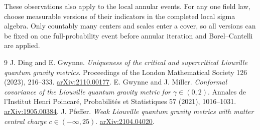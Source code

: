 \documentclass[11pt]{article}
\theoremstyle{definition}
\theoremstyle{remark}
\begin{document}
These observations also apply to the local annular events.
For any one field law, choose measurable versions of their
indicators in the completed local sigma algebra. Only
countably many centers and scales enter a cover, so all
versions can be fixed on one full-probability event before
annular iteration and Borel--Cantelli are applied.

\begin{thebibliography}{9}
J. Ding and E. Gwynne.
\emph{Uniqueness of the critical and supercritical Liouville quantum
gravity metrics}. Proceedings of the London Mathematical Society
126 (2023), 216--333. \href{https://arxiv.org/abs/2110.00177}{arXiv:2110.00177}.
E. Gwynne and J. Miller.
\emph{Conformal covariance of the Liouville quantum gravity metric
for $\gamma\in(0,2)$}. Annales de l'Institut Henri Poincar\'e,
Probabilit\'es et Statistiques 57 (2021), 1016--1031.
\href{https://arxiv.org/abs/1905.00384}{arXiv:1905.00384}.
J. Pfeffer.
\emph{Weak Liouville quantum gravity metrics with matter central
charge $c\in(-\infty,25)$}.
\href{https://arxiv.org/abs/2104.04020}{arXiv:2104.04020}.
\end{thebibliography}
\end{document}
